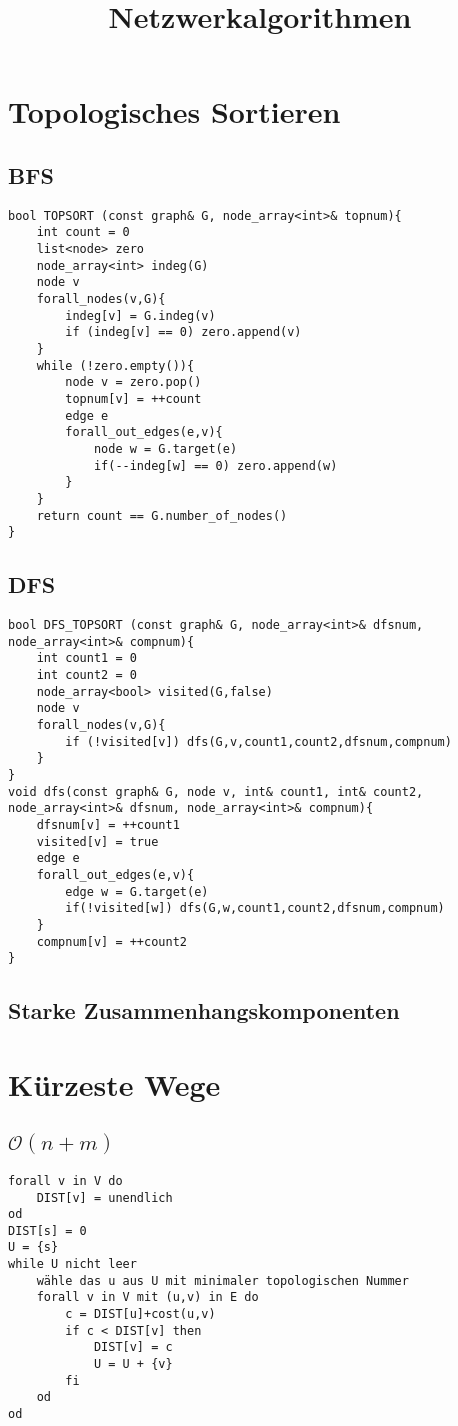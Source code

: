 \documentclass[a4paper]{article}
\newcommand{\oh}[1]{$\mathcal{O}(#1)$}
\begin{document}
\title{Netzwerkalgorithmen}
\maketitle
\section{Topologisches Sortieren}
\subsection{BFS}
\begin{lstlisting}
bool TOPSORT (const graph& G, node_array<int>& topnum){
	int count = 0
	list<node> zero
	node_array<int> indeg(G)
	node v
	forall_nodes(v,G){
		indeg[v] = G.indeg(v)
		if (indeg[v] == 0) zero.append(v)
	}
	while (!zero.empty()){
		node v = zero.pop()
		topnum[v] = ++count
		edge e
		forall_out_edges(e,v){
			node w = G.target(e)
			if(--indeg[w] == 0) zero.append(w)
		}
	}
	return count == G.number_of_nodes()
}
\end{lstlisting}
\subsection{DFS}
\begin{lstlisting}
bool DFS_TOPSORT (const graph& G, node_array<int>& dfsnum, node_array<int>& compnum){
	int count1 = 0
	int count2 = 0
	node_array<bool> visited(G,false)
	node v
	forall_nodes(v,G){
		if (!visited[v]) dfs(G,v,count1,count2,dfsnum,compnum)
	}
}
void dfs(const graph& G, node v, int& count1, int& count2, node_array<int>& dfsnum, node_array<int>& compnum){
	dfsnum[v] = ++count1
	visited[v] = true
	edge e
	forall_out_edges(e,v){
		edge w = G.target(e)
		if(!visited[w]) dfs(G,w,count1,count2,dfsnum,compnum)
	}
	compnum[v] = ++count2
}
\end{lstlisting}
\subsection{Starke Zusammenhangskomponenten}
\section{Kürzeste Wege}
\subsection{\oh{n+m}}
\begin{lstlisting}
forall v in V do
	DIST[v] = unendlich
od
DIST[s] = 0
U = {s}
while U nicht leer
	wähle das u aus U mit minimaler topologischen Nummer
	forall v in V mit (u,v) in E do
		c = DIST[u]+cost(u,v)
		if c < DIST[v] then
			DIST[v] = c
			U = U + {v}
		fi
	od
od

\end{lstlisting}
\end{document}
